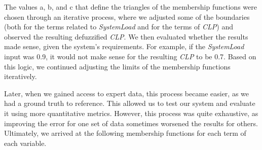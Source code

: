 \documentclass[titlepage]{article}
\begin{document}
The values a, b, and c that define the triangles of the membership functions were chosen through an iterative process, where we adjusted some of the boundaries (both for the terms related to \textit{SystemLoad} and for the terms of \textit{CLP}) and observed the resulting defuzzified \textit{CLP}.
We then evaluated whether the results made sense, given the system's requirements. For example, if the \textit{SystemLoad} input was 0.9, it would not make sense for the resulting \textit{CLP} to be 0.7. Based on this logic, we continued adjusting the limits of the membership functions iteratively.

Later, when we gained access to expert data, this process became easier, as we had a ground truth to reference.
This allowed us to test our system and evaluate it using more quantitative metrics.
However, this process was quite exhaustive, as improving the error for one set of data sometimes worsened the results for others.
Ultimately, we arrived at the following membership functions for each term of each variable.
\end{document}
